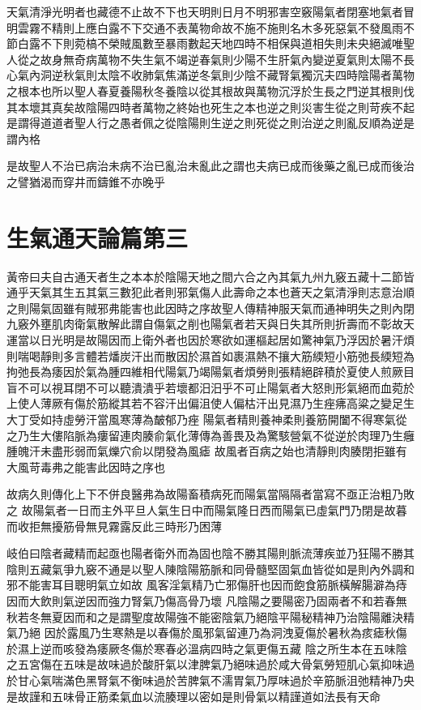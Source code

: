 天氣清淨光明者也藏德不止故不下也天明則日月不明邪害空竅陽氣者閉塞地氣者冒明雲霧不精則上應白露不下交通不表萬物命故不施不施則名木多死惡氣不發風雨不節白露不下則菀槁不榮賊風數至暴雨數起天地四時不相保與道相失則未央絕滅唯聖人從之故身無奇病萬物不失生氣不竭逆春氣則少陽不生肝氣內變逆夏氣則太陽不長心氣內洞逆秋氣則太陰不收肺氣焦滿逆冬氣則少陰不藏腎氣獨沉夫四時陰陽者萬物之根本也所以聖人春夏養陽秋冬養陰以從其根故與萬物沉浮於生長之門逆其根則伐其本壞其真矣故陰陽四時者萬物之終始也死生之本也逆之則災害生從之則苛疾不起是謂得道道者聖人行之愚者佩之從陰陽則生逆之則死從之則治逆之則亂反順為逆是謂內格

是故聖人不治已病治未病不治已亂治未亂此之謂也夫病已成而後藥之亂已成而後治之譬猶渴而穿井而鑄錐不亦晚乎


\section{生氣通天論篇第三}

黃帝曰夫自古通天者生之本本於陰陽天地之間六合之內其氣九州九竅五藏十二節皆通乎天氣其生五其氣三數犯此者則邪氣傷人此壽命之本也蒼天之氣清淨則志意治順之則陽氣固雖有賊邪弗能害也此因時之序故聖人傳精神服天氣而通神明失之則內閉九竅外壅肌肉衛氣散解此謂自傷氣之削也陽氣者若天與日失其所則折壽而不彰故天運當以日光明是故陽因而上衛外者也因於寒欲如運樞起居如驚神氣乃浮因於暑汗煩則喘喝靜則多言體若燔炭汗出而散因於濕首如裹濕熱不攘大筋緛短小筋弛長緛短為拘弛長為痿因於氣為腫四維相代陽氣乃竭陽氣者煩勞則張精絕辟積於夏使人煎厥目盲不可以視耳閉不可以聽潰潰乎若壞都汨汨乎不可止陽氣者大怒則形氣絕而血菀於上使人薄厥有傷於筋縱其若不容汗出偏沮使人偏枯汗出見濕乃生痤疿高粱之變足生大丁受如持虛勞汗當風寒薄為皶郁乃痤
陽氣者精則養神柔則養筋開闔不得寒氣從之乃生大僂陷脈為瘻留連肉腠俞氣化薄傳為善畏及為驚駭營氣不從逆於肉理乃生癰腫魄汗未盡形弱而氣爍穴俞以閉發為風瘧
故風者百病之始也清靜則肉腠閉拒雖有大風苛毒弗之能害此因時之序也

故病久則傳化上下不併良醫弗為故陽畜積病死而陽氣當隔隔者當寫不亟正治粗乃敗之
故陽氣者一日而主外平旦人氣生日中而陽氣隆日西而陽氣已虛氣門乃閉是故暮而收拒無擾筋骨無見霧露反此三時形乃困薄

岐伯曰陰者藏精而起亟也陽者衛外而為固也陰不勝其陽則脈流薄疾並乃狂陽不勝其陰則五藏氣爭九竅不通是以聖人陳陰陽筋脈和同骨髓堅固氣血皆從如是則內外調和邪不能害耳目聰明氣立如故
風客淫氣精乃亡邪傷肝也因而飽食筋脈橫解腸澼為痔因而大飲則氣逆因而強力腎氣乃傷高骨乃壞
凡陰陽之要陽密乃固兩者不和若春無秋若冬無夏因而和之是謂聖度故陽強不能密陰氣乃絕陰平陽秘精神乃治陰陽離決精氣乃絕
因於露風乃生寒熱是以春傷於風邪氣留連乃為洞洩夏傷於暑秋為痎瘧秋傷於濕上逆而咳發為痿厥冬傷於寒春必溫病四時之氣更傷五藏
陰之所生本在五味陰之五宮傷在五味是故味過於酸肝氣以津脾氣乃絕味過於咸大骨氣勞短肌心氣抑味過於甘心氣喘滿色黑腎氣不衡味過於苦脾氣不濡胃氣乃厚味過於辛筋脈沮弛精神乃央是故謹和五味骨正筋柔氣血以流腠理以密如是則骨氣以精謹道如法長有天命


